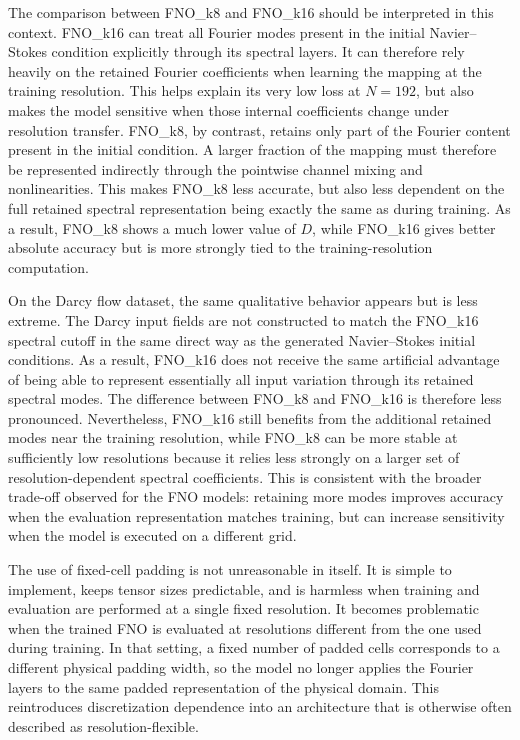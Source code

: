 The comparison between FNO\_k8 and FNO\_k16 should be interpreted in this context. FNO\_k16 can treat all Fourier modes present in the initial Navier--Stokes condition explicitly through its spectral layers. It can therefore rely heavily on the retained Fourier coefficients when learning the mapping at the training resolution. This helps explain its very low loss at \(N=192\), but also makes the model sensitive when those internal coefficients change under resolution transfer. FNO\_k8, by contrast, retains only part of the Fourier content present in the initial condition. A larger fraction of the mapping must therefore be represented indirectly through the pointwise channel mixing and nonlinearities. This makes FNO\_k8 less accurate, but also less dependent on the full retained spectral representation being exactly the same as during training. As a result, FNO\_k8 shows a much lower value of \(D\), while FNO\_k16 gives better absolute accuracy but is more strongly tied to the training-resolution computation.

On the Darcy flow dataset, the same qualitative behavior appears but is less extreme. The Darcy input fields are not constructed to match the FNO\_k16 spectral cutoff in the same direct way as the generated Navier--Stokes initial conditions. As a result, FNO\_k16 does not receive the same artificial advantage of being able to represent essentially all input variation through its retained spectral modes. The difference between FNO\_k8 and FNO\_k16 is therefore less pronounced. Nevertheless, FNO\_k16 still benefits from the additional retained modes near the training resolution, while FNO\_k8 can be more stable at sufficiently low resolutions because it relies less strongly on a larger set of resolution-dependent spectral coefficients. This is consistent with the broader trade-off observed for the FNO models: retaining more modes improves accuracy when the evaluation representation matches training, but can increase sensitivity when the model is executed on a different grid.

The use of fixed-cell padding is not unreasonable in itself. It is simple to implement, keeps tensor sizes predictable, and is harmless when training and evaluation are performed at a single fixed resolution. It becomes problematic when the trained FNO is evaluated at resolutions different from the one used during training. In that setting, a fixed number of padded cells corresponds to a different physical padding width, so the model no longer applies the Fourier layers to the same padded representation of the physical domain. This reintroduces discretization dependence into an architecture that is otherwise often described as resolution-flexible.





